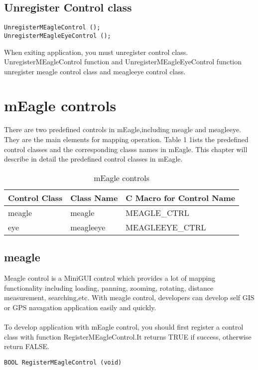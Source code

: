 \documentclass[a4paper]{article}
\begin{document}
\subsection{Unregister Control class}
\begin{lstlisting}
UnregisterMEagleControl ();
UnregisterMEagleEyeControl ();
\end{lstlisting}
When exiting application, you must unregister control class. UnregisterMEagleControl function and UnregisterMEagleEyeControl function  unregister meagle control class and meagleeye control class.


\newpage



\section{mEagle controls}
There are two predefined controls in mEagle,including meagle and meagleeye. They are the main elements for mapping operation. Table 1 1ists the predefined control classes and the corresponding classs names in mEagle. This chapter will describe in detail the predefined control classes in mEagle. 
\begin{table}[h]
\centering
\caption{mEagle controls}
\begin{tabular}{lll}
\hline
Control Class  & Class Name    & C Macro for Control Name \\[5pt] \hline
meagle         & meagle    & MEAGLE\_CTRL \\ 
eye            & meagleeye & MEAGLEEYE\_CTRL  \\ \hline
\end{tabular}
\end{table}


\subsection{meagle}
Meagle control is a MiniGUI control which provides a lot of mapping functionality including loading, panning, zooming, rotating, distance measurement, searching,etc. With meagle control, developers can develop self GIS or GPS navagation application easily and quickly.  \\ \\
To develop application with mEagle control, you should first register a control class with function RegisterMEagleControl.It returns TRUE if success, otherwise return FALSE. 
\begin{lstlisting}
BOOL RegisterMEagleControl (void)
\end{lstlisting} 
\end{document}
